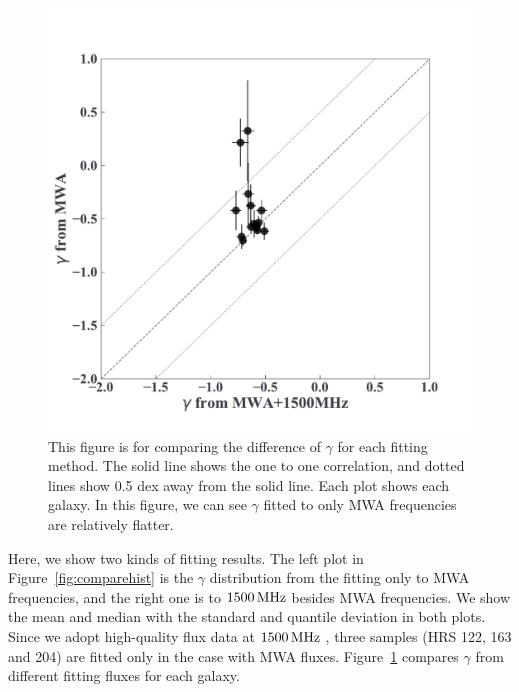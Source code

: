 \begin{figure}[htbp]
	\centering
	\includegraphics[width=.6\linewidth]{Chapter_5/Figures/Result_comparealpha.pdf}
    \caption[The comparison of $\gamma$ from different fitting methods]{\label{fig:comparegamma}
        This figure is for comparing the difference of $\gamma$ for each fitting method.
        The solid line shows the one to one correlation, and dotted lines show 0.5 dex away from the solid line.
        Each plot shows each galaxy.
        In this figure, we can see $\gamma$ fitted to only MWA frequencies are relatively flatter.
    }
\end{figure}

Here, we show two kinds of fitting results.
The left plot in Figure~\ref{fig:comparehist} is the $\gamma$ distribution from the fitting only to MWA frequencies, and the right one is to $1500\,\mathrm{MHz}$ besides MWA frequencies.
We show the mean and median with the standard and quantile deviation in both plots.
Since we adopt high-quality flux data at $1500\,\mathrm{MHz}$ \citep{Boselli2015}, three samples (HRS 122, 163 and 204) are fitted only in the case with MWA fluxes.
Figure~\ref{fig:comparegamma} compares $\gamma$ from different fitting fluxes for each galaxy.


